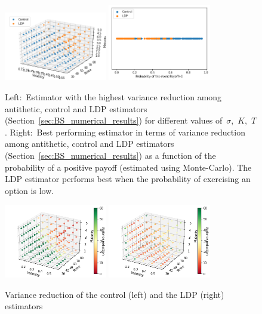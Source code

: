 \begin{figure}[H]
    \centering
    \includegraphics[width=0.4\textwidth]{content/reschap3/Figures/BS/compare1.png}
    \includegraphics[width=0.4\textwidth]{content/reschap3/Figures/BS/compare2.png}
    \caption{Left:~Estimator with the highest variance reduction among antithetic, control and LDP estimators (Section~\ref{sec:BS_numerical_results}) for different values of~$\sigma$,~$K$,~$T$. Right:~Best performing estimator in terms of variance reduction among antithetic, control and LDP estimators (Section~\ref{sec:BS_numerical_results}) as a function of the probability of a positive payoff (estimated using Monte-Carlo). The LDP estimator performs best when the probability of exercising an option is low.
    }\label{fig:BSCompare}
\end{figure}
\begin{figure}[H]
    \centering
    \includegraphics[width=0.4\textwidth]{content/reschap3/Figures/BS/control.png}
    \includegraphics[width=0.4\textwidth]{content/reschap3/Figures/BS/ldp.png}
    \caption{Variance reduction of the control (left) and 
     the LDP (right) estimators}\label{fig:BSLDP}
\end{figure}

